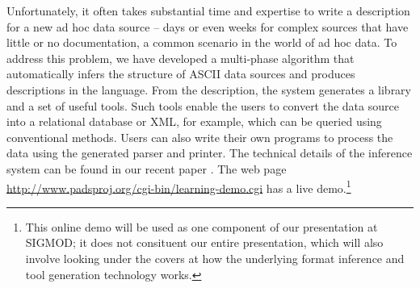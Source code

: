 \documentclass[preprint]{sig-alternate-sigmod08}
\begin{document}
Unfortunately, it often takes substantial time and expertise
to write a \pads{} description for a new ad hoc data source
-- days or even weeks for complex sources that have little or
no documentation, a common scenario in the world of ad hoc data.
To address this problem, we have developed a multi-phase algorithm that automatically
infers the structure of ASCII data sources and produces descriptions
in the \pads{} language. From the \pads{} description, the system
generates a library and a set of useful tools. Such tools enable the
users to convert the data source into a relational database or XML,
for example, which can be queried using conventional methods. Users
can also write their  own programs to process the data using
the generated parser and printer.
The technical details of the inference system can be found in our recent
paper 
\cite{Fisher+:dirttoshovels}.  The web page
\url{http://www.padsproj.org/cgi-bin/learning-demo.cgi} has a live demo.\footnote{This 
online demo will be used as one component of our presentation at SIGMOD;  
it does not consituent our entire presentation, which will also involve looking
under the covers at how the underlying format inference and tool generation
technology works.}


\end{document}
